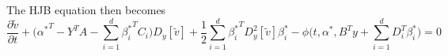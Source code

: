 The HJB equation then becomes
\begin{equation}
    \frac{\partial \tilde{v}}{\partial t} + \bigg({\alpha^\ast}^T - Y^T A - \sum_{i=1}^d {\beta_i^\ast}^T C_i\bigg)D_y[\tilde{v}] + \frac12 \sum_{i=1}^d {\beta_i^\ast}^T D_y^2[\tilde{v}] {\beta_i^\ast} - \phi\bigg(t, \alpha^\ast, B^T y + \sum_{i=1}^d D_i^T \beta_i^\ast \bigg) = 0 \label{eq: dual_hjb}
\end{equation}


